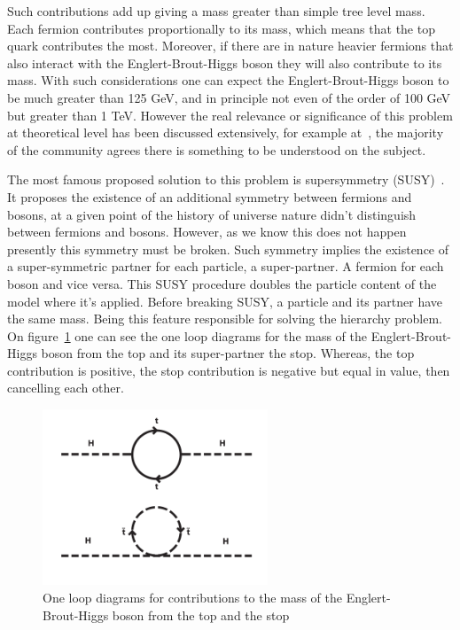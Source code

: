 Such contributions add up giving a mass greater than simple tree level mass. Each fermion contributes proportionally to its mass, which means that the top quark contributes the most. Moreover, if there are in nature heavier fermions that also interact with the Englert-Brout-Higgs boson they will also contribute to its mass. With such considerations one can expect the Englert-Brout-Higgs boson to be much greater than 125 GeV, and in principle not even of the order of 100 GeV but greater than 1 TeV. However the real relevance or significance of this problem at theoretical level has been discussed extensively, for example at~\cite{Jegerlehner:2013nna}, the majority of the community agrees there is something to be understood on the subject. 

The most famous proposed solution to this problem is supersymmetry (SUSY)~\cite{Martin:1997ns}. It proposes the existence of an additional symmetry between fermions and bosons, at a given point of the history of universe nature didn't distinguish between fermions and bosons. However, as we know this does not happen presently this symmetry must be broken. Such symmetry implies the existence of a super-symmetric partner for each particle, a super-partner. A fermion for each boson and vice versa. This SUSY procedure doubles the particle content of the model where it's applied. Before breaking SUSY, a particle and its partner have the same mass. Being this feature responsible for solving the hierarchy problem. On figure~\ref{fig:susy} one can see the one loop diagrams for the mass of the Englert-Brout-Higgs boson from the top and its super-partner the stop. Whereas, the top contribution is positive, the stop contribution is negative but equal in value, then cancelling each other.

\begin{figure}[!Hhtbp]
  \begin{center}
    \includegraphics[width=0.6\textwidth]{figs/SUSY.png}
    \caption{One loop diagrams for contributions to the mass of the Englert-Brout-Higgs boson from the top and the stop}
    \label{fig:susy}
  \end{center}
\end{figure}

